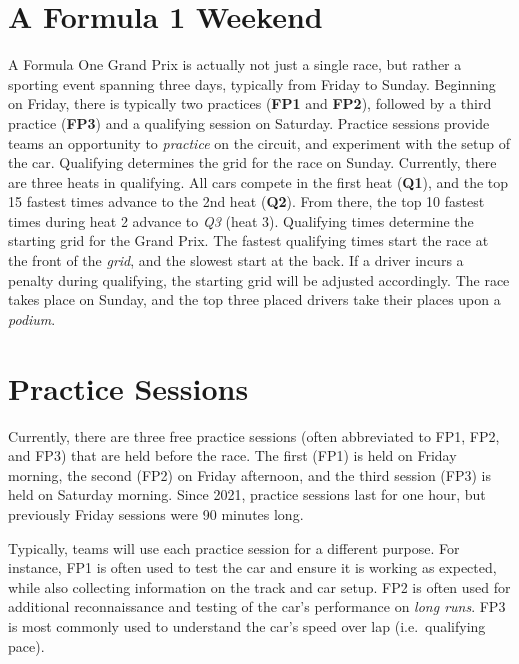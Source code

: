 \documentclass[
]{book}
\begin{document}
\hypertarget{a-formula-1-weekend}{%
\section{A Formula 1 Weekend}\label{a-formula-1-weekend}}

A Formula One Grand Prix is actually not just a single race, but rather a sporting event spanning three days, typically from Friday to Sunday. Beginning on Friday, there is typically two practices (\textbf{FP1} and \textbf{FP2}), followed by a third practice (\textbf{FP3}) and a qualifying session on Saturday. Practice sessions provide teams an opportunity to \emph{practice} on the circuit, and experiment with the setup of the car. Qualifying determines the grid for the race on Sunday. Currently, there are three heats in qualifying. All cars compete in the first heat (\textbf{Q1}), and the top 15 fastest times advance to the 2nd heat (\textbf{Q2}). From there, the top 10 fastest times during heat 2 advance to \emph{Q3} (heat 3). Qualifying times determine the starting grid for the Grand Prix. The fastest qualifying times start the race at the front of the \emph{grid}, and the slowest start at the back. If a driver incurs a penalty during qualifying, the starting grid will be adjusted accordingly. The race takes place on Sunday, and the top three placed drivers take their places upon a \emph{podium}.

\hypertarget{practice-sessions}{%
\section{Practice Sessions}\label{practice-sessions}}

Currently, there are three free practice sessions (often abbreviated to FP1, FP2, and FP3) that are held before the race. The first (FP1) is held on Friday morning, the second (FP2) on Friday afternoon, and the third session (FP3) is held on Saturday morning. Since 2021, practice sessions last for one hour, but previously Friday sessions were 90 minutes long.

Typically, teams will use each practice session for a different purpose. For instance, FP1 is often used to test the car and ensure it is working as expected, while also collecting information on the track and car setup. FP2 is often used for additional reconnaissance and testing of the car's performance on \emph{long runs}. FP3 is most commonly used to understand the car's speed over lap (i.e.~qualifying pace).
\end{document}
